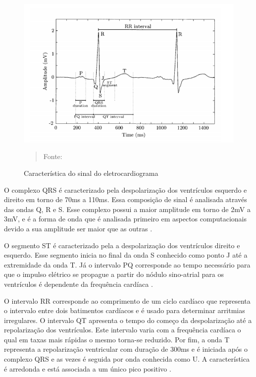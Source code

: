 \documentclass[12pt, a4paper]{article}
\begin{document}
\begin{figure}[!htb]
\begin{center}
			\caption{Característica do sinal do eletrocardiograma}

\includegraphics[width=.5\textwidth]{Figuras/ecg1.PNG}
            \vspace*{\fill} 
            \begin{quote} 
            \centering 
            Fonte: \cite{sornmo}
            \end{quote}
            \vspace*{\fill}
			\label{fig:ecg}
\end{center}
\end{figure}



O complexo QRS é caracterizado pela despolarização dos ventrículos esquerdo e direito em torno de 70ms a 110ms. Essa composição de sinal é analisada através das ondas Q, R e S. Esse complexo possui a maior amplitude em torno de 2mV a 3mV, e é a forma de onda que é analisada primeiro em aspectos computacionais devido a sua amplitude ser maior que as outras  \cite{sornmo}. 

O segmento ST é caracterizado pela a despolarização dos ventrículos direito e esquerdo. Esse segmento inicia no final da onda S conhecido como ponto J até a extremidade da onda T. Já o intervalo PQ corresponde ao tempo necessário para que o impulso elétrico se propague a partir do nódulo sino-atrial para os ventrículos é dependente da frequência cardíaca \cite{sornmo}.

O intervalo RR corresponde ao comprimento de um ciclo cardíaco que representa o intervalo entre dois batimentos cardíacos e é usado para determinar arritmias irregulares. O intervalo QT apresenta o tempo do começo da despolarização até a repolarização dos ventrículos. Este intervalo varia com a frequência cardíaca o qual em taxas mais rápidas o mesmo torna-se reduzido. Por fim, a onda T representa a repolarização ventricular com duração de 300ms e é iniciada após o complexo QRS e as vezes é seguida por onda conhecida como U. A característica é arredonda e está associada a um único pico positivo \cite{sornmo}.
\end{document}
